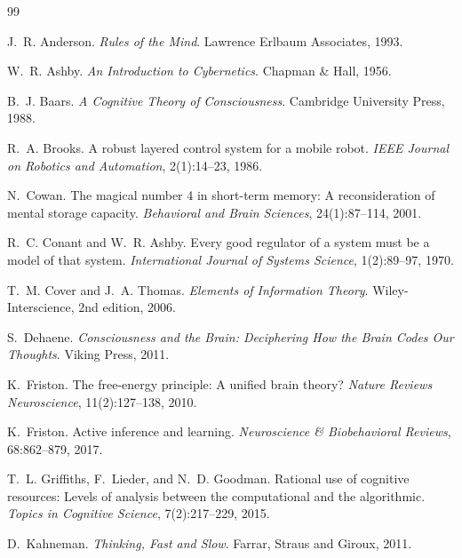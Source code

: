 \documentclass[11pt]{article}
\theoremstyle{definition}
\begin{document}

\begin{thebibliography}{99}

J.~R. Anderson.
\newblock \emph{Rules of the Mind}.
\newblock Lawrence Erlbaum Associates, 1993.

W.~R. Ashby.
\newblock \emph{An Introduction to Cybernetics}.
\newblock Chapman \& Hall, 1956.

B.~J. Baars.
\newblock \emph{A Cognitive Theory of Consciousness}.
\newblock Cambridge University Press, 1988.

R.~A. Brooks.
\newblock A robust layered control system for a mobile robot.
\newblock \emph{IEEE Journal on Robotics and Automation}, 2(1):14--23, 1986.

N.~Cowan.
\newblock The magical number 4 in short-term memory: A reconsideration of
  mental storage capacity.
\newblock \emph{Behavioral and Brain Sciences}, 24(1):87--114, 2001.

R.~C. Conant and W.~R. Ashby.
\newblock Every good regulator of a system must be a model of that system.
\newblock \emph{International Journal of Systems Science}, 1(2):89--97, 1970.

T.~M. Cover and J.~A. Thomas.
\newblock \emph{Elements of Information Theory}.
\newblock Wiley-Interscience, 2nd edition, 2006.

S.~Dehaene.
\newblock \emph{Consciousness and the Brain: Deciphering How the Brain Codes
  Our Thoughts}.
\newblock Viking Press, 2011.



K.~Friston.
\newblock The free-energy principle: A unified brain theory?
\newblock \emph{Nature Reviews Neuroscience}, 11(2):127--138, 2010.

K.~Friston.
\newblock Active inference and learning.
\newblock \emph{Neuroscience \& Biobehavioral Reviews}, 68:862--879, 2017.

T.~L. Griffiths, F.~Lieder, and N.~D. Goodman.
\newblock Rational use of cognitive resources: Levels of analysis between the
  computational and the algorithmic.
\newblock \emph{Topics in Cognitive Science}, 7(2):217--229, 2015.

D.~Kahneman.
\newblock \emph{Thinking, Fast and Slow}.
\newblock Farrar, Straus and Giroux, 2011.


\end{thebibliography}
\end{document}
